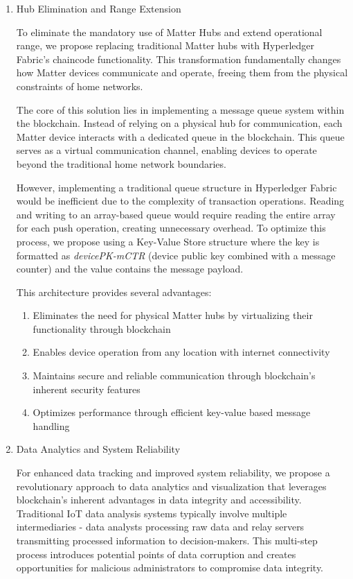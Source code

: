 \documentclass[conference]{IEEEtran}
\begin{document}
	\begin{enumerate}[itemsep=2ex, parsep=1ex]
		\item Hub Elimination and Range Extension

			To eliminate the mandatory use of Matter Hubs and extend operational range,
			we propose replacing traditional Matter hubs with Hyperledger Fabric's chaincode
			functionality. This transformation fundamentally changes how Matter
			devices communicate and operate, freeing them from the physical constraints
			of home networks.

			The core of this solution lies in implementing a message queue system within
			the blockchain. Instead of relying on a physical hub for communication, each
			Matter device interacts with a dedicated queue in the blockchain. This
			queue serves as a virtual communication channel, enabling devices to operate
			beyond the traditional home network boundaries.

			However, implementing a traditional queue structure in Hyperledger Fabric
			would be inefficient due to the complexity of transaction operations. Reading
			and writing to an array-based queue would require reading the entire array
			for each push operation, creating unnecessary overhead. To optimize this process,
			we propose using a Key-Value Store structure where the key is formatted as
			\emph{devicePK-mCTR} (device public key combined with a message counter) and
			the value contains the message payload.

			This architecture provides several advantages:
			\begin{enumerate}[itemsep=2ex, parsep=1ex]
				\item Eliminates the need for physical Matter hubs by virtualizing their
					functionality through blockchain

				\item Enables device operation from any location with internet connectivity

				\item Maintains secure and reliable communication through blockchain's inherent
					security features

				\item Optimizes performance through efficient key-value based message handling
			\end{enumerate}

		\item Data Analytics and System Reliability

			For enhanced data tracking and improved system reliability, we propose a revolutionary
			approach to data analytics and visualization that leverages blockchain's inherent
			advantages in data integrity and accessibility. Traditional IoT data
			analysis systems typically involve multiple intermediaries - data analysts
			processing raw data and relay servers transmitting processed information
			to decision-makers. This multi-step process introduces potential points of
			data corruption and creates opportunities for malicious administrators to compromise
			data integrity.


\end{enumerate}
\end{document}
